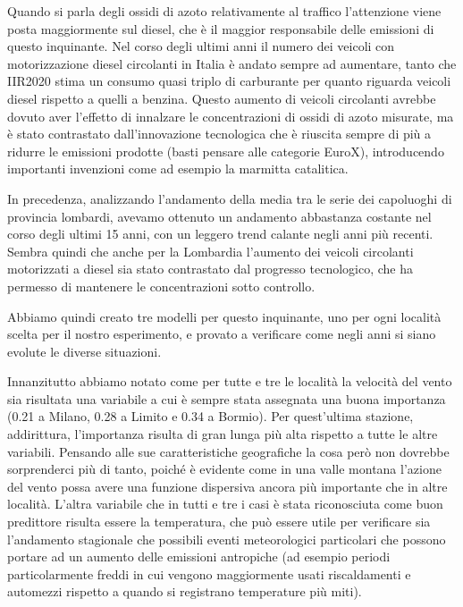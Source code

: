 \documentclass[a4paper]{report}
\begin{document}
Quando si parla degli ossidi di azoto relativamente al traffico l'attenzione viene posta maggiormente sul diesel, che è il maggior responsabile delle emissioni di questo inquinante. Nel corso degli ultimi anni il numero dei veicoli con motorizzazione diesel circolanti in Italia è andato sempre ad aumentare, tanto che IIR2020 \cite{iir2020} stima un consumo quasi triplo di carburante per quanto riguarda veicoli diesel rispetto a quelli a benzina. Questo aumento di veicoli circolanti avrebbe dovuto aver l'effetto di innalzare le concentrazioni di ossidi di azoto misurate, ma è stato contrastato dall'innovazione tecnologica che è riuscita sempre di più a ridurre le emissioni prodotte (basti pensare alle categorie EuroX), introducendo importanti invenzioni come ad esempio la marmitta catalitica.

In precedenza, analizzando  l'andamento della media tra le serie dei capoluoghi di provincia lombardi, avevamo ottenuto un andamento abbastanza costante nel corso degli ultimi 15 anni, con un leggero trend calante negli anni più recenti. Sembra quindi che anche per la Lombardia l'aumento dei veicoli circolanti motorizzati a diesel sia stato contrastato dal progresso tecnologico, che ha permesso di mantenere le concentrazioni sotto controllo.

Abbiamo quindi creato tre modelli per questo inquinante, uno per ogni località scelta per il nostro esperimento, e provato a verificare come negli anni si siano evolute le diverse situazioni.

Innanzitutto abbiamo notato come per tutte e tre le località la velocità del vento sia risultata una variabile a cui è sempre stata assegnata una buona importanza (0.21 a Milano, 0.28 a Limito e 0.34 a Bormio). Per quest'ultima stazione, addirittura, l'importanza risulta di gran lunga più alta rispetto a tutte le altre variabili.  Pensando alle sue caratteristiche geografiche la cosa però non dovrebbe sorprenderci più di tanto, poiché è evidente come in una valle montana l'azione del vento possa avere una funzione dispersiva ancora più importante che in altre località.
L'altra variabile che in tutti e tre i casi è stata riconosciuta come buon predittore risulta essere la temperatura, che può essere utile per verificare sia l'andamento stagionale che possibili eventi meteorologici particolari che possono portare ad un aumento delle emissioni antropiche (ad esempio periodi particolarmente freddi in cui vengono maggiormente usati riscaldamenti e automezzi rispetto a quando si registrano temperature più miti).  
\end{document}
